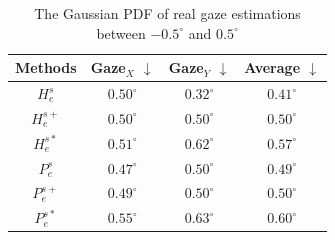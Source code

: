 \begin{table}[htbp]
	\centering
  	\caption{The Gaussian PDF of real gaze estimations between $-0.5^\circ$ and $0.5^\circ$}
  	\label{tab:real-gaussian-distribution}
  	\begin{tabular}{cccc}
    	\toprule
	    	Methods & Gaze$_X$ $\downarrow$ & Gaze$_Y$ $\downarrow$ & Average $\downarrow$ \\
    	\midrule
    		$H_e^s$ & $0.50^\circ$ & $\boldsymbol{0.32^\circ}$ & $\boldsymbol{0.41^\circ}$ \\
	    	$H_e^{s+}$ & $0.50^\circ$ & $0.50^\circ$ & $0.50^\circ$ \\
    		$H_e^{s*}$ & $0.51^\circ$ & $0.62^\circ$ & $0.57^\circ$ \\
    		$P_e^s$ & $\boldsymbol{0.47^\circ}$ & $0.50^\circ$ & $0.49^\circ$ \\
	    	$P_e^{s+}$ & $0.49^\circ$ & $0.50^\circ$ & $0.50^\circ$ \\
    		$P_e^{s*}$ & $0.55^\circ$ & $0.63^\circ$ & $0.60^\circ$ \\
  		\bottomrule
	\end{tabular}
\end{table}
